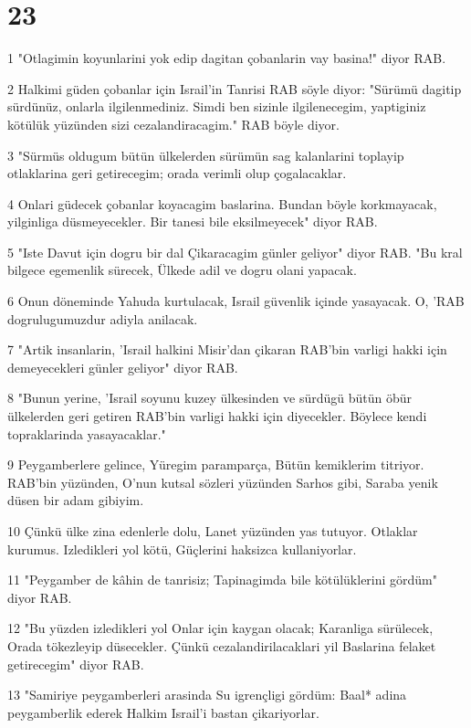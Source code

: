 \chapter{23}

\par 1 "Otlagimin koyunlarini yok edip dagitan çobanlarin vay basina!" diyor RAB.
\par 2 Halkimi güden çobanlar için Israil'in Tanrisi RAB söyle diyor: "Sürümü dagitip sürdünüz, onlarla ilgilenmediniz. Simdi ben sizinle ilgilenecegim, yaptiginiz kötülük yüzünden sizi cezalandiracagim." RAB böyle diyor.
\par 3 "Sürmüs oldugum bütün ülkelerden sürümün sag kalanlarini toplayip otlaklarina geri getirecegim; orada verimli olup çogalacaklar.
\par 4 Onlari güdecek çobanlar koyacagim baslarina. Bundan böyle korkmayacak, yilginliga düsmeyecekler. Bir tanesi bile eksilmeyecek" diyor RAB.
\par 5 "Iste Davut için dogru bir dal Çikaracagim günler geliyor" diyor RAB. "Bu kral bilgece egemenlik sürecek, Ülkede adil ve dogru olani yapacak.
\par 6 Onun döneminde Yahuda kurtulacak, Israil güvenlik içinde yasayacak. O, 'RAB dogrulugumuzdur adiyla anilacak.
\par 7 "Artik insanlarin, 'Israil halkini Misir'dan çikaran RAB'bin varligi hakki için demeyecekleri günler geliyor" diyor RAB.
\par 8 "Bunun yerine, 'Israil soyunu kuzey ülkesinden ve sürdügü bütün öbür ülkelerden geri getiren RAB'bin varligi hakki için diyecekler. Böylece kendi topraklarinda yasayacaklar."
\par 9 Peygamberlere gelince, Yüregim paramparça, Bütün kemiklerim titriyor. RAB'bin yüzünden, O'nun kutsal sözleri yüzünden Sarhos gibi, Saraba yenik düsen bir adam gibiyim.
\par 10 Çünkü ülke zina edenlerle dolu, Lanet yüzünden yas tutuyor. Otlaklar kurumus. Izledikleri yol kötü, Güçlerini haksizca kullaniyorlar.
\par 11 "Peygamber de kâhin de tanrisiz; Tapinagimda bile kötülüklerini gördüm" diyor RAB.
\par 12 "Bu yüzden izledikleri yol Onlar için kaygan olacak; Karanliga sürülecek, Orada tökezleyip düsecekler. Çünkü cezalandirilacaklari yil Baslarina felaket getirecegim" diyor RAB.
\par 13 "Samiriye peygamberleri arasinda Su igrençligi gördüm: Baal* adina peygamberlik ederek Halkim Israil'i bastan çikariyorlar.
